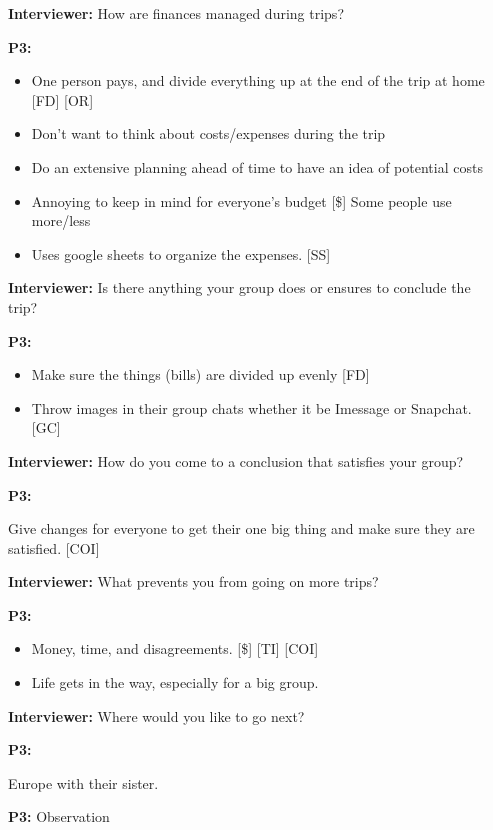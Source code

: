 \documentclass[12pt,a4paper]{article}
\begin{document}
\textbf{Interviewer:} How are finances managed during trips?   

\textbf{P3:}

\begin{itemize}
    \item One person pays, and divide everything up at the end of the trip at home [FD] [OR]
    \item Don’t want to think about costs/expenses during the trip
    \item Do an extensive planning ahead of time to have an idea of potential costs
    \item Annoying to keep in mind for everyone’s budget [\$]
Some people use more/less

    \item Uses google sheets to organize the expenses. [SS]
\end{itemize}

\textbf{Interviewer:} Is there anything your group does or ensures to conclude the trip?   

\textbf{P3:}

\begin{itemize}
    \item Make sure the things (bills) are divided up evenly [FD]
    \item Throw images in their group chats whether it be Imessage or Snapchat. [GC] 
\end{itemize}

\textbf{Interviewer:} How do you come to a conclusion that satisfies your group?   

\textbf{P3:}

Give changes for everyone to get their one big thing and make sure they are satisfied. [COI]

\textbf{Interviewer:} What prevents you from going on more trips?

\textbf{P3:}

\begin{itemize}
    \item Money, time, and disagreements. [\$] [TI] [COI]
    \item Life gets in the way, especially for a big group. 
\end{itemize}

\textbf{Interviewer:} Where would you like to go next?   

\textbf{P3:}

Europe with their sister. 

\textbf{P3:} Observation
\end{document}
